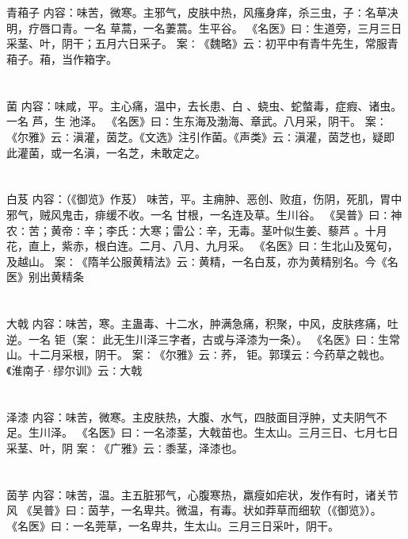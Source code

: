 \documentclass[12pt,UTF8]{ctexbook}
\begin{document}
\section{}青葙子
内容：味苦，微寒。主邪气，皮肤中热，风瘙身痒，杀三虫，子∶名草决明，疗唇口青。一名 
草蒿，一名萋蒿。生平谷。 
《名医》曰∶生道旁，三月三日采茎、叶，阴干；五月六日采子。 
案∶《魏略》云∶初平中有青牛先生，常服青葙子。葙，当作箱字。 


\section{}菌
内容：味咸，平。主心痛，温中，去长患、白 、蛲虫、蛇螫毒，症瘕、诸虫。一名 芦，生 
池泽。 
《名医》曰∶生东海及渤海、章武。八月采，阴干。 
案∶《尔雅》云∶滇灌，茵芝。《文选》注引作菌。《声类》云∶滇灌，茵芝也，疑即 
此灌菌，或一名滇，一名芝，未敢定之。 


\section{}白芨
内容：（《御览》作芨） 
味苦，平。主痈肿、恶创、败疽，伤阴，死肌，胃中邪气，贼风鬼击，痱缓不收。一名 
甘根，一名连及草。生川谷。 
《吴普》曰∶神农∶苦；黄帝∶辛；李氏∶大寒；雷公∶辛，无毒。茎叶似生姜、藜芦 
。十月花，直上，紫赤，根白连。二月、八月、九月采。 
《名医》曰∶生北山及冤句，及越山。 
案∶《隋羊公服黄精法》云∶黄精，一名白芨，亦为黄精别名。今《名医》别出黄精条 


\section{}大戟
内容：味苦，寒。主蛊毒、十二水，肿满急痛，积聚，中风，皮肤疼痛，吐逆。一名 钜（案∶ 
此无生川泽三字者，古或与泽漆为一条）。 
《名医》曰∶生常山。十二月采根，阴干。 
案∶《尔雅》云∶荞， 钜。郭璞云∶今药草之戟也。《淮南子·缪尔训》云∶大戟 


\section{}泽漆
内容：味苦，微寒。主皮肤热，大腹、水气，四肢面目浮肿，丈夫阴气不足。生川泽。 
《名医》曰∶一名漆茎，大戟苗也。生太山。三月三日、七月七日采茎、叶，阴 
案∶《广雅》云∶黍茎，泽漆也。 


\section{}茵芋
内容：味苦，温。主五脏邪气，心腹寒热，羸瘦如疟状，发作有时，诸关节风 
《吴普》曰∶茵芋，一名卑共。微温，有毒。状如莽草而细软（《御览》）。 
《名医》曰∶一名莞草，一名卑共，生太山。三月三日采叶，阴干。 
\end{document}
